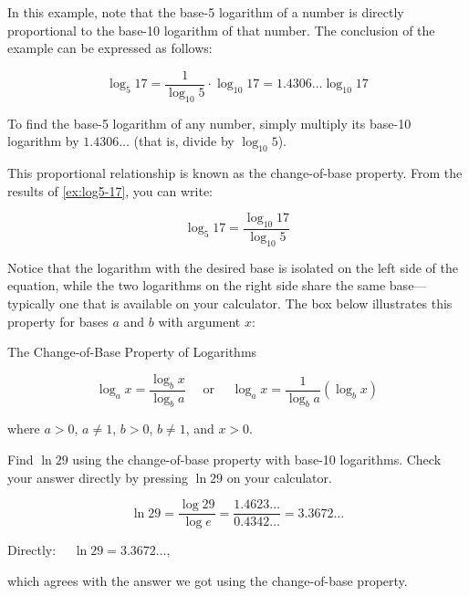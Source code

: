 In this example, note that the base-5 logarithm of a number is directly proportional to the base-10 logarithm of that number. The conclusion of the example can be expressed as follows:

\[
\log_5 17 = \frac{1}{\log_{10} 5} \cdot \log_{10} 17 = 1.4306 \ldots \log_{10} 17
\]

To find the base-5 logarithm of any number, simply multiply its base-10 logarithm by \(1.4306 \ldots\) (that is, divide by \(\log_{10} 5\)).

This proportional relationship is known as the change-of-base property. From the results of \autoref{ex:log5-17}, you can write:

\[
\log_5 17 = \frac{\log_{10} 17}{\log_{10} 5}
\]

Notice that the logarithm with the desired base is isolated on the left side of the equation, while the two logarithms on the right side share the same base—typically one that is available on your calculator. The box below illustrates this property for bases \(a\) and \(b\) with argument \(x\):

\begin{custombox}{The Change-of-Base Property of Logarithms}

\begin{equation*}
\log _a x=\frac{\log_b x}{\log_b a} \quad \text { or } \quad \log_a x=\frac{1}{\log_b a}\left(\log_b x\right)
\end{equation*}

where $a>0$, $a\neq 1$, $b>0$, $b\neq 1$, and $x>0$.
    
\end{custombox}

\begin{example}
Find $\ln 29$ using the change-of-base property with base-10 logarithms. Check your answer directly by pressing $\ln 29$ on your calculator.

\begin{solution}

\[
\ln 29=\frac{\log 29}{\log e}=\frac{1.4623 \ldots}{0.4342 \ldots}=3.3672 \ldots
\]

\hspace{0.9cm} Directly: $\quad \ln 29=3.3672 \ldots,$

which agrees with the answer we got using the change-of-base property.
\end{solution}
\end{example}

